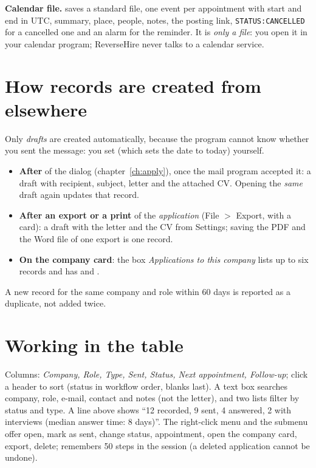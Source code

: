 \textbf{Calendar file.}  saves a standard  file, one event per
appointment with start and end in UTC, summary, place, people, notes, the posting link, \texttt{STATUS:CANCELLED}
for a cancelled one and an alarm for the reminder. It is \emph{only a file}: you open it in your calendar program;
ReverseHire never talks to a calendar service.

\section{How records are created from elsewhere}
Only \emph{drafts} are created automatically, because the program cannot know whether you sent the message:
you set  (which sets the date to today) yourself.
\begin{itemize}
  \item \textbf{After } of the  dialog (chapter~\ref{ch:apply}), once the mail
        program accepted it: a draft with recipient, subject, letter and the attached CV. Opening the \emph{same} draft
        again updates that record.
  \item \textbf{After an export or a print} of the \emph{application} (File $>$ Export, with a card): a draft
        with the letter and the CV from Settings; saving the PDF and the Word file of one export is one record.
  \item \textbf{On the company card}: the box \emph{Applications to this company} lists up to six records and has
         and .
\end{itemize}
A new record for the same company and role within 60 days is reported as a duplicate, not added twice.

\section{Working in the table}
Columns: \emph{Company, Role, Type, Sent, Status, Next appointment, Follow-up}; click a header to sort (status in
workflow order, blanks last). A text box searches company, role, e-mail, contact and notes (not the letter), and
two lists filter by status and type. A line above shows ``12 recorded, 9 sent, 4 answered, 2 with interviews
(median answer time: 8 days)''. The right-click menu and the submenu  offer open,
mark as sent, change status, appointment, open the company card, export, delete;  remembers 50
steps in the session (a deleted application cannot be undone).

